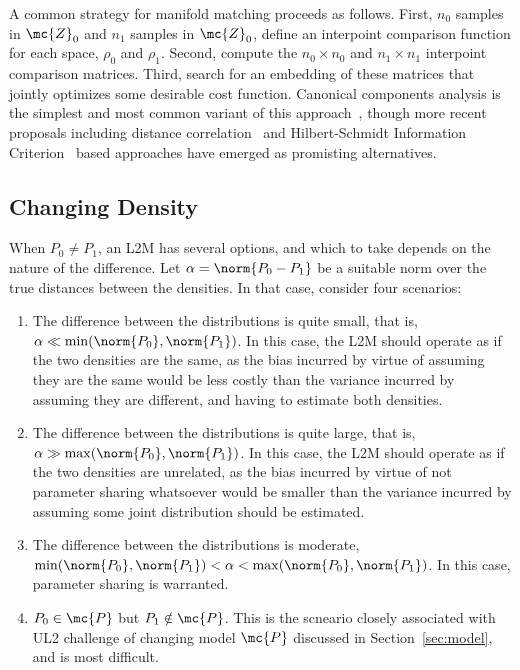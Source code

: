 \documentclass{article}
\begin{document}
A common strategy for manifold matching proceeds as follows.  First, $n_0$ samples in $\mc{Z}_0$ and $n_1$ samples in $\mc{Z}_0$, define an interpoint comparison function for each space, $\rho_0$ and $\rho_1$.  Second, compute the $n_0 \times n_0$ and $n_1 \times n_1$ interpoint comparison matrices.  Third, search for an embedding of these matrices that jointly optimizes some desirable cost function.  Canonical components analysis is the simplest and most common variant of this approach~\cite{Hardoon2004-cg}, though more recent proposals including distance correlation~\cite{Cowley2017-ll} and Hilbert-Schmidt Information Criterion~\cite{Chang2013-iz} based approaches have emerged as promisting alternatives. 



\subsection{Changing Density}

When $P_0 \neq P_1$, an L2M  has several options, and which to take depends on the nature of the difference.  Let $\alpha=\norm{ P_0 - P_1}$ be a suitable norm over the true distances between the densities.  In that case, consider four scenarios:
\begin{enumerate}
    \item The difference between the distributions is quite small, that is, $\alpha \ll \min (\norm{P_0},\norm{P_1} )$.  In this case, the L2M should operate as if the two densities are the same, as the bias incurred by virtue of assuming they are the same would be less costly than the variance incurred by assuming they are different, and having to estimate both densities.
    \item The difference between the distributions is quite large, that is, $\alpha \gg \max (\norm{P_0},\norm{P_1} )$. In this case, the L2M should operate as if the two densities are unrelated, as the bias incurred by virtue of not parameter sharing whatsoever would be smaller than the variance incurred by assuming some joint distribution should be estimated.
    \item The difference between the distributions is moderate, $\min (\norm{P_0},\norm{P_1} ) < \alpha < \max (\norm{P_0},\norm{P_1} )$.  In this case, parameter sharing is warranted. 
    \item $P_0 \in \mc{P}$ but $P_1 \notin \mc{P}$.  This is the scneario closely associated with UL2 challenge of changing model $\mc{P}$ discussed in Section~\ref{sec:model}, and is most difficult. 
\end{enumerate}
\end{document}
